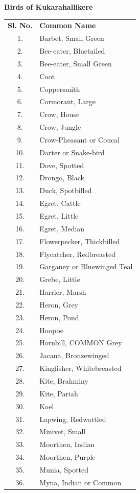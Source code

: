 \begin{center}
\smallskip
\textbf{Birds of Kukarahallikere}
\end{center}
\begin{longtable}{cl}
\textbf{Sl. No.} & \textbf{Common Name}\\
1. & Barbet, Small Green \\
2. &Bee-eater, Bluetailed \\
3. &Bee-eater, Small Green \\
4. &Coot \\
5. &Coppersmith \\
6. &Cormorant, Large \\
7. &Crow, House \\
8. &Crow, Jungle \\
9. &Crow-Pheasant or Coucal \\
10.& Darter or Snake-bird \\
11.& Dove, Spotted \\
12.& Drongo, Black \\
13.& Duck, Spotbilled\\ 
14.& Egret, Cattle \\
15.& Egret, Little \\
16. &Egret, Median \\
17. &Flowerpecker, Thickbilled \\
18.& Flycatcher, Redbreasted \\
19.& Garganey or Bluewinged Teal \\
20.& Grebe, Little \\
21.& Harrier, Marsh \\
22.& Heron, Grey \\
23.& Heron, Pond \\
24.& Hoopoe \\
25.& Hornbill, COMMON Grey \\
26.& Jacana, Bronzewinged \\
27.& Kingfisher, Whitebreasted \\
28.& Kite, Brahminy \\
29.& Kite, Pariah \\
30.& Koel \\
31.& Lapwing, Redwattled \\
32.& Minivet, Small \\
33.& Moorthen, Indian \\
34.& Moorthen, Purple \\
35.& Munia, Spotted \\
36.& Myna, Indian or Common \\

\end{longtable}
